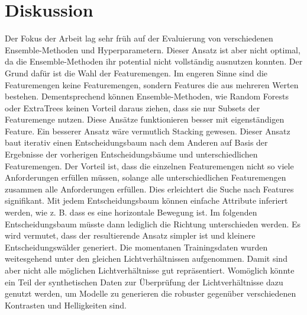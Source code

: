 \chapter{Diskussion}
Der Fokus der Arbeit lag sehr früh auf der Evaluierung von verschiedenen Ensemble-Methoden und Hyperparametern. Dieser Ansatz ist aber nicht optimal, da die Ensemble-Methoden ihr potential nicht vollständig
ausnutzen konnten. Der Grund dafür ist die Wahl der Featuremengen. Im engeren Sinne sind die Featuremengen keine Featuremengen, sondern Features die aus mehreren Werten bestehen. Dementsprechend können
Ensemble-Methoden, wie Random Forests oder ExtraTrees keinen Vorteil daraus ziehen, dass sie nur Subsets der Featuremenge nutzen. Diese Ansätze funktionieren besser mit eigenständigen Feature.
\newline
\newline
Ein besserer Ansatz wäre vermutlich Stacking gewesen. Dieser Ansatz baut iterativ einen Entscheidungsbaum nach dem Anderen auf Basis der Ergebnisse der vorherigen Entscheidungsbäume und
unterschiedlichen Featuremengen. Der Vorteil ist, dass die einzelnen Featuremengen nicht so viele Anforderungen erfüllen müssen, solange alle unterschiedlichen Featuremengen zusammen alle
Anforderungen erfüllen. Dies erleichtert die Suche nach Features signifikant. Mit jedem Entscheidungsbaum können einfache Attribute inferiert werden, wie z. B. dass es eine horizontale Bewegung ist.
Im folgenden Entscheidungsbaum müsste dann lediglich die Richtung unterschieden werden. Es wird vermutet, dass der resultierende Ansatz simpler ist und kleinere Entscheidungswälder generiert.
\newline
\newline
Die momentanen Trainingsdaten wurden weitesgehend unter den gleichen Lichtverhältnissen aufgenommen. Damit sind aber nicht alle möglichen Lichtverhältnisse gut repräsentiert. Womöglich könnte ein
Teil der synthetischen Daten zur Überprüfung der Lichtverhältnisse dazu genutzt werden, um Modelle zu generieren die robuster gegenüber verschiedenen Kontrasten und Helligkeiten sind.